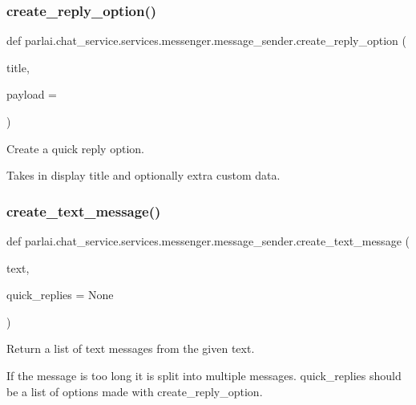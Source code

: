 \subsubsection{\texorpdfstring{create\+\_\+reply\+\_\+option()}{create\_reply\_option()}}
{\footnotesize\ttfamily def parlai.\+chat\+\_\+service.\+services.\+messenger.\+message\+\_\+sender.\+create\+\_\+reply\+\_\+option (\begin{DoxyParamCaption}\item[{}]{title,  }\item[{}]{payload = {\ttfamily \textquotesingle{}\textquotesingle{}} }\end{DoxyParamCaption})}

\begin{DoxyVerb}Create a quick reply option.

Takes in display title and optionally extra custom data.
\end{DoxyVerb}
 \mbox{\label{namespaceparlai_1_1chat__service_1_1services_1_1messenger_1_1message__sender_a4c32dfd7947a473a730b81e9356e3513}} 
\subsubsection{\texorpdfstring{create\+\_\+text\+\_\+message()}{create\_text\_message()}}
{\footnotesize\ttfamily def parlai.\+chat\+\_\+service.\+services.\+messenger.\+message\+\_\+sender.\+create\+\_\+text\+\_\+message (\begin{DoxyParamCaption}\item[{}]{text,  }\item[{}]{quick\+\_\+replies = {\ttfamily None} }\end{DoxyParamCaption})}

\begin{DoxyVerb}Return a list of text messages from the given text.

If the message is too long it is split into multiple messages. quick_replies should
be a list of options made with create_reply_option.
\end{DoxyVerb}
 


